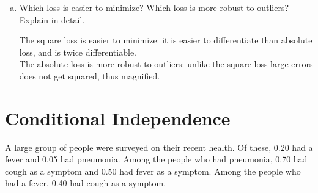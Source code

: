 \documentclass[11pt]{article}
\begin{document}
\begin{enumerate}[(a)]
\begin{answertext}{11cm}{}
\end{answertext} 

\item Which loss is easier to minimize?  Which loss is more robust to outliers?  Explain in detail.\\
\begin{answertext}{9cm}{}

The square loss is easier to minimize: it is easier to differentiate than absolute loss, and is twice differentiable. \\
The absolute loss is more robust to outliers: unlike the square loss large errors does not get squared, thus magnified. \\

\end{answertext} 

\end{enumerate}

\pagebreak
\section{Conditional Independence}
A large group of people were surveyed on their recent health. Of these, 0.20 had a fever and 0.05 had pneumonia. Among the people who had pneumonia, 0.70 had cough as a symptom and 0.50 had fever as a symptom. Among the people who had a fever, 0.40 had cough as a symptom.
\end{document}
